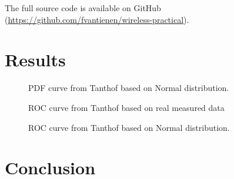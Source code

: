 \documentclass[]{article}
\begin{document}
The full source code is available on GitHub (\url{https://github.com/fvantienen/wireless-practical}).

\section{Results}

\begin{figure}[H]
    
    \caption{PDF curve from Tanthof based on Normal distribution.\label{fig:pdf_tant_norm}}
\end{figure}

\begin{figure}[H]
    
    \caption{ROC curve from Tanthof based on real measured data\label{fig:roc_tant_real}}
\end{figure}

\begin{figure}[H]
    
    \caption{ROC curve from Tanthof based on Normal distribution.\label{fig:roc_tant_norm}}
\end{figure}

\section{Conclusion}


\end{document}
